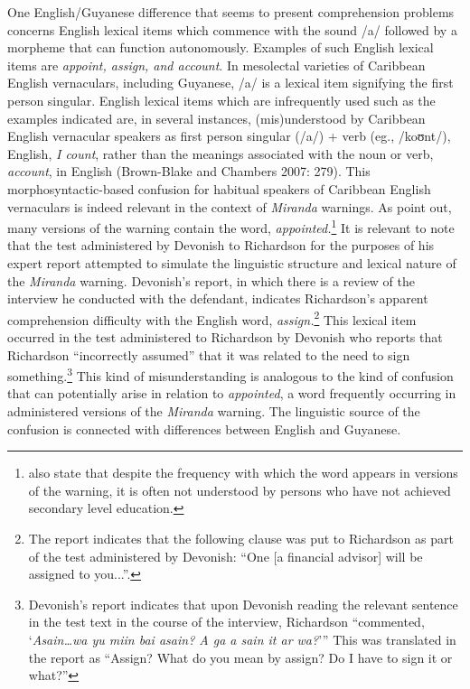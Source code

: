 \documentclass[output=paper,colorlinks,citecolor=brown]{langscibook}
\begin{document}
\largerpage
One English/Guyanese difference that seems to present comprehension problems concerns English lexical items which commence with the sound /a/ followed by a morpheme that can function autonomously. Examples of such English lexical items are \emph{appoint, assign, \textit{and} account}. In mesolectal varieties of Caribbean English vernaculars, including Guyanese, /a/ is a lexical item signifying the first person singular. English lexical items which are infrequently used such as the examples indicated are, in several instances, (mis)understood by Caribbean English vernacular speakers as first person singular (/a/) + verb (eg., /koʊnt/), English, \emph{I count}, rather than the meanings associated with the noun or verb, \emph{account}, in English (Brown-Blake and Chambers 2007: 279). This morphosyntactic-based confusion for habitual speakers of Caribbean English vernaculars is indeed relevant in the context of \emph{Miranda} warnings. As \citet[130]{Rogers2008} point out, many versions of the warning contain the word, \emph{appointed.}\footnote{\citet[130]{Rogers2008} also state that despite the frequency with which the word appears in versions of the warning, it is often not understood by persons who have not achieved secondary level education.} It is relevant to note that the test administered by Devonish to Richardson for the purposes of his expert report attempted to simulate the linguistic structure and lexical nature of the \emph{Miranda} warning. Devonish’s report, in which there is a review of the interview he conducted with the defendant, indicates Richardson’s apparent comprehension difficulty with the English word, \emph{assign.}\footnote{The report indicates that the following clause was put to Richardson as part of the test administered by Devonish: “One [a financial advisor] will be assigned to you...”.} This lexical item occurred in the test administered to Richardson by Devonish who reports that Richardson “incorrectly assumed” that it was related to the need to sign something.\footnote{Devonish’s report indicates that upon Devonish reading the relevant sentence in the test text in the course of the interview, Richardson “commented, ‘\emph{Asain…wa yu miin bai asain? A ga a sain it ar wa?}’” This was translated in the report as “Assign? What do you mean by assign? Do I have to sign it or what?”} This kind of misunderstanding is analogous to the kind of confusion that can potentially arise in relation to \emph{appointed}, a word frequently occurring in administered versions of the \emph{Miranda} warning. The linguistic source of the confusion is connected with differences between English and Guyanese.  
\end{document}
